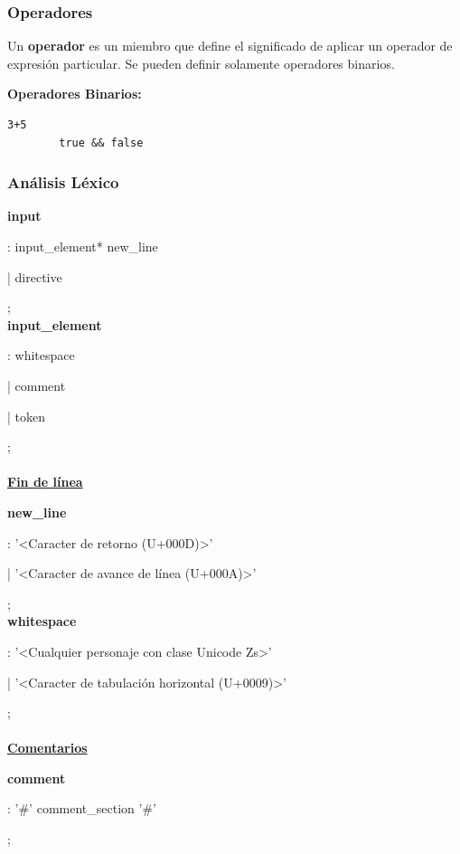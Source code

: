\documentclass[12pt, letterpaper,spanish]{article}
\theoremstyle{definition}
\theoremstyle{remark}
\begin{document}
	\subsubsection{Operadores}
	Un \textbf{operador} es un miembro que define el significado de aplicar un operador de expresión particular. Se pueden definir solamente operadores binarios.\par
	
	\textbf{Operadores Binarios:}
	\begin{lstlisting}[language={PySharp}]
		3+5
		true && false
	\end{lstlisting}
	
	\subsubsection{Análisis Léxico}
	\textbf{input}\par
	: input\_element* new\_line\par
	| directive\par
	; \\
	
	\textbf{input\_element}\par
	: whitespace\par
	| comment\par
	| token\par
	; \\ \\
	
	\underline{\textbf{Fin de línea}}\par
	\textbf{new\_line}\par
	: '<Caracter de retorno (U+000D)>'\par
	| '<Caracter de avance de línea (U+000A)>'\par
	; \\
	
	\textbf{whitespace}\par
	: '<Cualquier personaje con clase Unicode Zs>'\par
	| '<Caracter de tabulación horizontal (U+0009)>'\par
	; \\ \\
	
	\underline{\textbf{Comentarios}}\par
	\textbf{comment}\par
	: '\#' comment\_section '\#'\par
	; \\ \\
	
\end{document}
